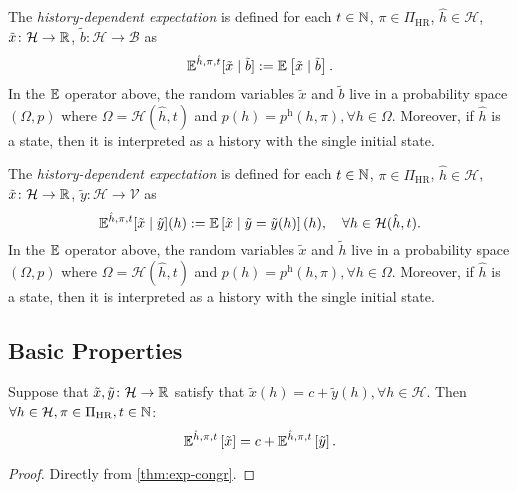 \begin{definition}\label{def:expect-h-cnd}
The \emph{history-dependent expectation} is defined for each $t\in \mathbb{N}$, $\pi\in \Pi_{\mathrm{HR}}$, $\hat{h}\in \mathcal{H}$, $\tilde{x}\colon \mathcal{H} \to \mathbb{R}$, $\tilde{b}\colon \mathcal{H} \to \mathcal{\mathcal{B}}$ as
\begin{equation*}
\mathbb{E}^{\hat{h}, \pi, t} [\tilde{x} \mid \tilde{b} ]
:= \mathbb{E} \left[ \tilde{x} \mid  \tilde{b} \right].
\end{equation*}
In the $\mathbb{E}$ operator above, the random variables $\tilde{x}$ and $\tilde{b}$ live in a probability space $(\Omega, p)$ where $\Omega = \mathcal{H}(\hat{h}, t)$ and $p(h) = p^{\mathrm{h}}(h, \pi), \forall h\in \Omega$.
Moreover, if $\hat{h}$ is a state, then it is interpreted as a history with the single initial state.
 \leanok
\end{definition}

\begin{definition}\label{def:expect-h-cnd-rv}
The \emph{history-dependent expectation} is defined for each $t\in \mathbb{N}$, $\pi\in \Pi_{\mathrm{HR}}$, $\hat{h}\in \mathcal{H}$, $\tilde{x}\colon \mathcal{H} \to \mathbb{R}$, $\tilde{y}\colon \mathcal{H} \to \mathcal{\mathcal{V}}$ as
\begin{equation*}
\mathbb{E}^{\hat{h}, \pi, t} [\tilde{x} \mid \tilde{y} ](h)
:= \mathbb{E} \left[ \tilde{x} \mid \tilde{y} = \tilde{y}(h) \right](h), \quad\forall h\in \mathcal{H}(\hat{h}, t).
\end{equation*}
In the $\mathbb{E}$ operator above, the random variables $\tilde{x}$ and $\tilde{h}$ live in a probability space $(\Omega, p)$ where $\Omega = \mathcal{H}(\hat{h}, t)$ and $p(h) = p^{\mathrm{h}}(h, \pi), \forall h\in \Omega$.
Moreover, if $\hat{h}$ is a state, then it is interpreted as a history with the single initial state.
 \leanok
\end{definition}


\subsection{Basic Properties}


\begin{theorem} \label{thm:exph-congr}
Suppose that $\tilde{x}, \tilde{y} \colon \mathcal{H} \to \mathbb{R} $ satisfy that $\tilde{x}(h) = c + \tilde{y}(h), \forall h \in \mathcal{H}$. Then $\forall h\in \mathcal{H}, \pi\in \Pi_{\mathrm{HR}}, t \in \mathbb{N}$:
\[
  \mathbb{E}^{\hat{h}, \pi, t} \left[ \tilde{x} \right]
  =
  c + \mathbb{E}^{\hat{h}, \pi, t} \left[ \tilde{y} \right].
\]
 \leanok
\end{theorem}
\begin{proof}
Directly from \cref{thm:exp-congr}. 
\end{proof}

